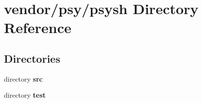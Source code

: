 \section{vendor/psy/psysh Directory Reference}
\label{dir_e7331e84e1942dfc22b5de8244f9940a}
\subsection*{Directories}
\begin{DoxyCompactItemize}
\item 
directory {\bf src}
\item 
directory {\bf test}
\end{DoxyCompactItemize}
